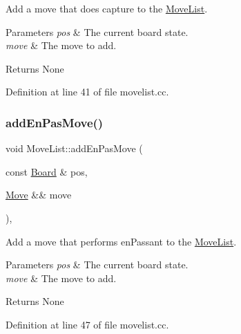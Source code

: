 Add a move that does capture to the \mbox{\hyperlink{classMoveList}{Move\+List}}. 


\begin{DoxyParams}{Parameters}
{\em pos} & The current board state. \\
\hline
{\em move} & The move to add. \\
\hline
\end{DoxyParams}
\begin{DoxyReturn}{Returns}
None 
\end{DoxyReturn}


Definition at line 41 of file movelist.\+cc.

\mbox{\label{classMoveList_a7e381e3b0f8e9c7caf670ec470b8143d}} 
\subsubsection{\texorpdfstring{add\+En\+Pas\+Move()}{addEnPasMove()}}
{\footnotesize\ttfamily void Move\+List\+::add\+En\+Pas\+Move (\begin{DoxyParamCaption}\item[{const \mbox{\hyperlink{classBoard}{Board}} \&}]{pos,  }\item[{\mbox{\hyperlink{classMove}{Move}} \&\&}]{move }\end{DoxyParamCaption})\hspace{0.3cm}{\ttfamily [private]}, {\ttfamily [noexcept]}}



Add a move that performs en\+Passant to the \mbox{\hyperlink{classMoveList}{Move\+List}}. 


\begin{DoxyParams}{Parameters}
{\em pos} & The current board state. \\
\hline
{\em move} & The move to add. \\
\hline
\end{DoxyParams}
\begin{DoxyReturn}{Returns}
None 
\end{DoxyReturn}


Definition at line 47 of file movelist.\+cc.

\mbox{\label{classMoveList_ac3af5c03221e2b73cfd7c5a4926c7b03}} 
